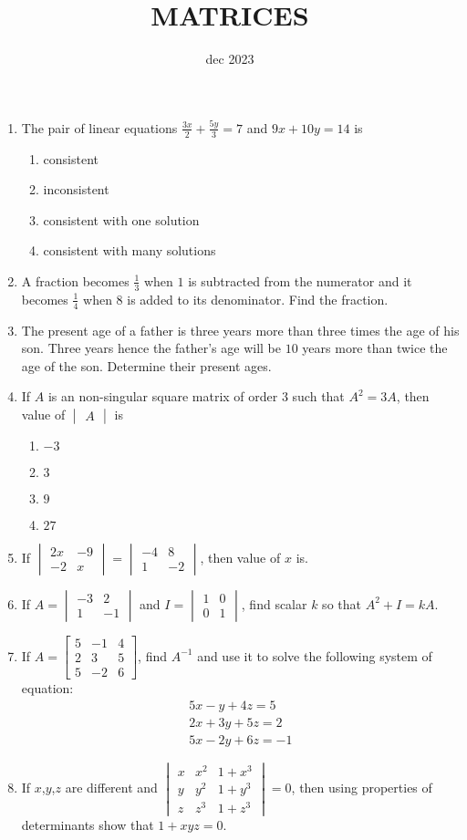 \documentclass[12pt,-letter paper]{article}
\title{MATRICES}
\author{}
\date{dec 2023}
\providecommand{\mydet}[1]{\ensuremath{\begin{vmatrix}#1\end{vmatrix}}}
\providecommand{\myvec}[1]{\ensuremath{\begin{bmatrix}#1\end{bmatrix}}}
\begin{document}
\maketitle
\begin{enumerate}
\item The pair of linear equations $\frac{3x}{2}+\frac{5y}{3}=7$ and $9x+10y=14$ is
\begin{enumerate}[label=(\alph*)]
\item consistent
\item inconsistent
\item consistent with one solution 
\item consistent with many solutions 
\end{enumerate}
\item A fraction becomes $\frac{1}{3}$ when $1$ is subtracted from the numerator and it becomes $\frac{1}{4}$ when $8$ is added to its denominator. Find the fraction.
\item The present age of a father is three years more than three times the age of his son. Three years hence the father's age will be $10$ years more than twice the age of the son. Determine their present ages.
\item If $A$ is an non-singular square matrix  of order $3$ such that $A^2=3A$, then value of $\mydet{A}$ is\\
\begin{enumerate}[label=(\alph*)]
\item $-3$
\item $3$
\item $9$
\item $27$
\end{enumerate}
\item If $\mydet{2x&-9\\ -2&x}=\mydet{-4&8\\ 1&-2}$, then value of $x$ is. 
\item If  $A=\mydet{-3&2\\ 1&-1}$ and $I=\mydet{1&0\\ 0&1}$, find scalar $k$ so that $A^2+I=kA$.
\item If $A=\myvec{5&-1&4\\ 2&3&5\\ 5&-2&6}$, find $A^{-1}$ and use it to solve the following system of equation: 
		\begin{align}
			5x-y+4z=5\\
			2x+3y+5z=2\\
			5x-2y+6z=-1
		\end{align}
\item If $x$,$y$,$z$ are different and $\mydet{x&x^{2}&1+x^{3}\\ y&y^{2}&1+y^{3}\\ z&z^{3}&1+z^{3}}=0$, then using properties of determinants show that $1+xyz=0$.
\end{enumerate}
\end{document}
